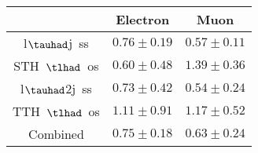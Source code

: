 \centering
\begin{tabular}{|c|c|c|} \hline
 & Electron & Muon\\\hline
l$\tauhad$j~ss & $0.76\pm0.19$ & $0.57\pm0.11$\\\hline
STH~$\tlhad$~os & $0.60\pm0.48$ & $1.39\pm0.36$\\\hline
l$\tauhad$2j~ss & $0.73\pm0.42$ & $0.54\pm0.24$\\\hline
TTH~$\tlhad$~os & $1.11\pm0.91$ & $1.17\pm0.52$\\\hline
Combined & $0.75\pm0.18$ & $0.63\pm0.24$\\\hline
\end{tabular}
